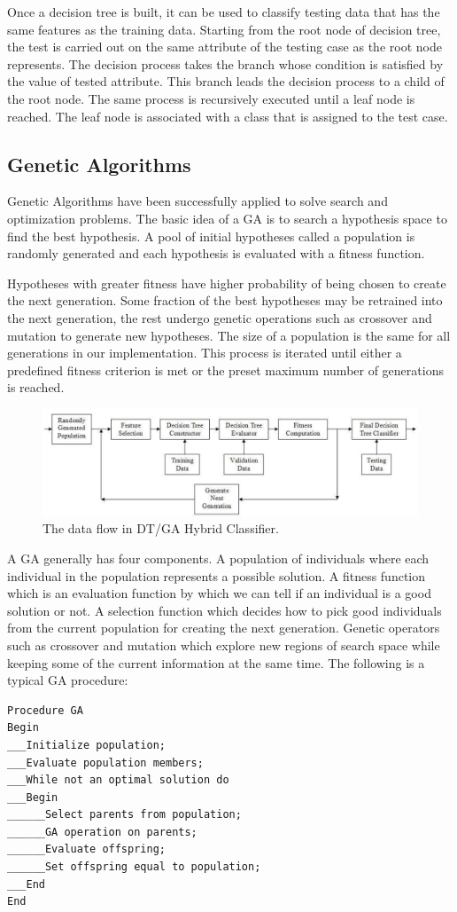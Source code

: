 \documentclass[conference]{IEEEtran}
\begin{document}
Once a decision tree is built, it can be used to classify testing data
that has the same features as the training data. Starting from the
root node of decision tree, the test is carried out on the same
attribute of the testing case as the root node represents. The
decision process takes the branch whose condition is satisfied by
the value of tested attribute. This branch leads the decision
process to a child of the root node. The same process is
recursively executed until a leaf node is reached. The leaf node is
associated with a class that is assigned to the test case.


\subsection{Genetic Algorithms}
Genetic Algorithms have been successfully applied to
solve search and optimization problems. The basic idea of a GA
is to search a hypothesis space to find the best hypothesis. A pool
of initial hypotheses called a population is randomly generated
and each hypothesis is evaluated with a fitness function.


Hypotheses with greater fitness have higher probability of being
chosen to create the next generation. Some fraction of the best
hypotheses may be retrained into the next generation, the rest
undergo genetic operations such as crossover and mutation to
generate new hypotheses. The size of a population is the same for
all generations in our implementation. This process is iterated
until either a predefined fitness criterion is met or the preset
maximum number of generations is reached.
\begin{figure}[h!]
  
  \centering
    \includegraphics[scale=0.25]{dfd.png}
\caption{The data flow in DT/GA Hybrid Classifier.}
\end{figure}


A GA generally has four components. A population of
individuals where each individual in the population represents a
possible solution. A fitness function which is an evaluation
function by which we can tell if an individual is a good solution
or not. A selection function which decides how to pick good
individuals from the current population for creating the next
generation. Genetic operators such as crossover and mutation
which explore new regions of search space while keeping some of
the current information at the same time.
The following is a typical GA procedure:
\begin{verbatim}
Procedure GA
Begin
___Initialize population;
___Evaluate population members;
___While not an optimal solution do
___Begin
______Select parents from population;
______GA operation on parents;
______Evaluate offspring;
______Set offspring equal to population;
___End
End
\end{verbatim}
\end{document}
